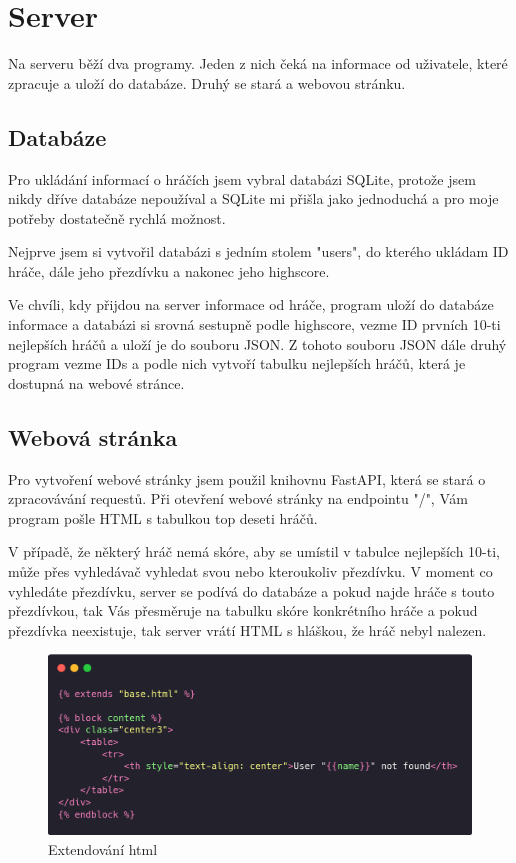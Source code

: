 \section{Server}
Na serveru běží dva programy. Jeden z nich čeká na informace od uživatele, které zpracuje a uloží do databáze. Druhý se stará a webovou stránku.

\subsection{Databáze}
Pro ukládání informací o hráčích jsem vybral databázi SQLite, protože jsem nikdy dříve databáze nepoužíval a SQLite mi přišla jako jednoduchá a pro moje potřeby dostatečně rychlá možnost.

Nejprve jsem si vytvořil databázi s jedním stolem "users", do kterého ukládam ID hráče, dále jeho přezdívku a nakonec jeho highscore.

Ve chvíli, kdy přijdou na server informace od hráče, program uloží do databáze informace a databázi si srovná sestupně podle highscore, vezme ID prvních 10-ti nejlepších hráčů a uloží je do souboru JSON. Z tohoto souboru JSON dále druhý program vezme IDs a podle nich vytvoří tabulku nejlepších hráčů, která je dostupná na webové stránce.

\subsection{Webová stránka}
Pro vytvoření webové stránky jsem použil knihovnu FastAPI, která se stará o zpracovávání requestů. Při otevření webové stránky na endpointu "/", Vám program pošle HTML s tabulkou top deseti hráčů.

V případě, že některý hráč nemá skóre, aby se umístil v tabulce nejlepších 10-ti, může přes vyhledávač vyhledat svou nebo kteroukoliv přezdívku. V moment co vyhledáte přezdívku, server se podívá do databáze a pokud najde hráče s touto přezdívkou, tak Vás přesměruje na tabulku skóre konkrétního hráče a pokud přezdívka neexistuje, tak server vrátí HTML s hláškou, že hráč nebyl nalezen. 

\begin{figure}[ht!]
    \centering
    \includegraphics[scale=0.3]{images/carbon (4).png}
    \caption{Extendování html}
\end{figure}

